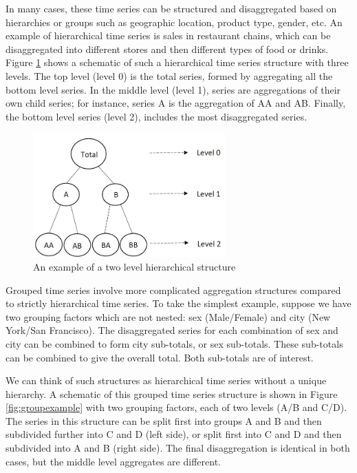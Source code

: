 \documentclass[11pt,a4paper,]{article}
\begin{document}
In many cases, these time series can be structured and disaggregated based on hierarchies or groups such as geographic location, product type, gender, etc. An example of hierarchical time series is sales in restaurant chains, which can be disaggregated into different stores and then different types of food or drinks. Figure \ref{fig:hierarchicalexample} shows a schematic of such a hierarchical time series structure with three levels. The top level (level 0) is the total series, formed by aggregating all the bottom level series. In the middle level (level 1), series are aggregations of their own child series; for instance, series A is the aggregation of AA and AB. Finally, the bottom level series (level 2), includes the most disaggregated series.

\begin{figure}

{\centering \includegraphics[width=280px,height=180px]{Paper-Figures/hierarchical_example} 

}

\caption{An example of a two level hierarchical structure}\label{fig:hierarchicalexample}
\end{figure}

Grouped time series involve more complicated aggregation structures compared to strictly hierarchical time series. To take the simplest example, suppose we have two grouping factors which are not nested: sex (Male/Female) and city (New York/San Francisco). The disaggregated series for each combination of sex and city can be combined to form city sub-totals, or sex sub-totals. These sub-totals can be combined to give the overall total. Both sub-totals are of interest.

We can think of such structures as hierarchical time series without a unique hierarchy. A schematic of this grouped time series structure is shown in Figure \ref{fig:groupexample} with two grouping factors, each of two levels (A/B and C/D). The series in this structure can be split first into groups A and B and then subdivided further into C and D (left side), or split first into C and D and then subdivided into A and B (right side). The final disaggregation is identical in both cases, but the middle level aggregates are different.
\end{document}
